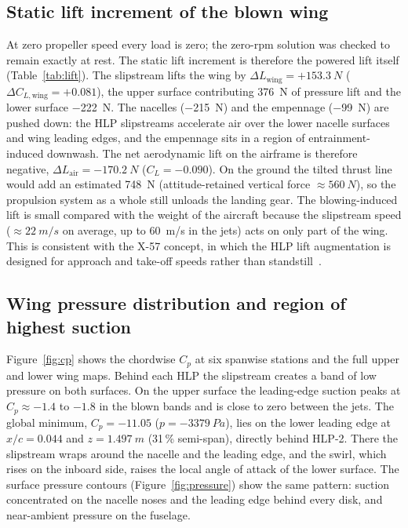 \documentclass[10pt,a4paper]{article}
\begin{document}
\subsection{Static lift increment of the blown wing}
At zero propeller speed every load is zero; the zero-rpm solution was checked to remain exactly at rest. The static
lift increment is therefore the powered lift itself (Table~\ref{tab:lift}). The slipstream lifts the wing by
$\Delta L_{\text{wing}}=+\SI{153.3}{N}$ ($\Delta C_{L,\text{wing}}=+0.081$), the upper surface contributing
\SI{+376}{N} of pressure lift and the lower surface \SI{-222}{N}. The nacelles (\SI{-215}{N}) and the empennage
(\SI{-99}{N}) are pushed down: the HLP slipstreams accelerate air over the lower nacelle surfaces and wing leading
edges, and the empennage sits in a region of entrainment-induced downwash. The net aerodynamic lift on the airframe
is therefore negative, $\Delta L_{\text{air}}=\SI{-170.2}{N}$ ($C_L=-0.090$). On the ground the tilted thrust line
would add an estimated \SI{+748}{N} (attitude-retained vertical force $\approx\SI{+560}{N}$), so the propulsion
system as a whole still unloads the landing gear. The blowing-induced lift is small compared with the weight of the
aircraft because the slipstream speed ($\approx\SI{22}{m/s}$ on average, up to \SI{60}{m/s} in the jets) acts on
only part of the wing. This is consistent with the X-57 concept, in which the HLP lift augmentation is designed for
approach and take-off speeds rather than standstill~\cite{patterson2016hlp,deere2017x57wing}.

\subsection{Wing pressure distribution and region of highest suction}
Figure~\ref{fig:cp} shows the chordwise $C_p$ at six spanwise stations and the full upper and lower wing maps.
Behind each HLP the slipstream creates a band of low pressure on both surfaces. On the upper surface the
leading-edge suction peaks at $C_p\approx-1.4$ to $-1.8$ in the blown bands and is close to zero between the jets.
The global minimum, $C_p=-11.05$ ($p=\SI{-3379}{Pa}$), lies on the lower leading edge at $x/c=0.044$ and
$z=\SI{1.497}{m}$ (31\,\% semi-span), directly behind HLP-2. There the slipstream wraps around the nacelle and the
leading edge, and the swirl, which rises on the inboard side, raises the local angle of attack of the lower surface.
The surface pressure contours (Figure~\ref{fig:pressure}) show the same pattern: suction concentrated on the
nacelle noses and the leading edge behind every disk, and near-ambient pressure on the fuselage.
\end{document}
